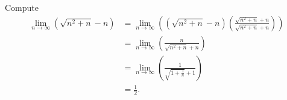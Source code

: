 \begin{Exercise}
	\begin{solution}
		Compute
		\begin{align*}
		\lim_{n\to\infty} \left( \sqrt{n^2+n}-n \right)
		&= \lim_{n\to\infty} \left( \left( \sqrt{n^2+n}-n \right) \left( \frac{\sqrt{n^2+n}+n}{\sqrt{n^2+n}+n} \right) \right) \\
		&= \lim_{n\to\infty} \left( \frac{n}{\sqrt{n^2+n}+n} \right) \\
		&= \lim_{n\to\infty} \left( \frac{1}{\sqrt{1+\frac{1}{n}}+1} \right) \\
		&= \frac{1}{2}.
		\end{align*}
	\end{solution}
\end{Exercise}